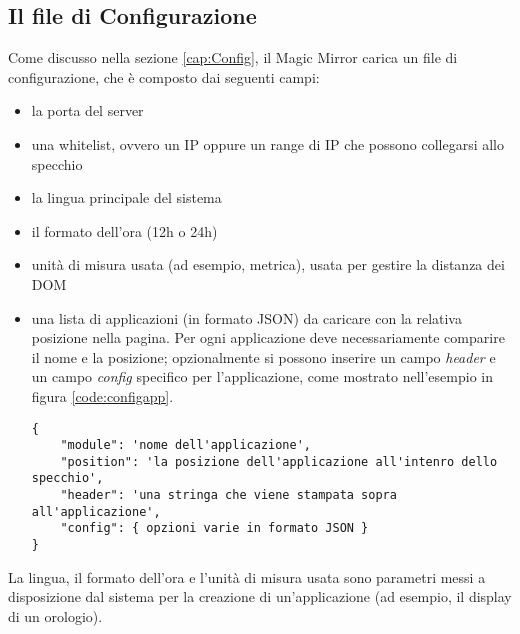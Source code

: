 \subsection{Il file di Configurazione}\label{cap:MMconf}
Come discusso nella sezione \ref{cap:Config}, il Magic Mirror carica un file di configurazione, che è composto dai seguenti campi:
\begin{itemize}
\item la porta del server
\item una whitelist, ovvero un IP oppure un range di IP che possono collegarsi allo specchio
\item la lingua principale del sistema
\item il formato dell'ora (12h o 24h)
\item unit\`a di misura usata (ad esempio, metrica), usata per gestire la distanza dei DOM
\item una lista di applicazioni (in formato JSON) da caricare con la relativa posizione nella pagina. Per ogni applicazione deve necessariamente comparire il
nome e la posizione; opzionalmente si possono inserire un campo  \textit{header} e un campo \textit{config} specifico per l'applicazione, come mostrato
nell'esempio in figura \ref{code:configapp}.
\begin{lstlisting}[label={code:configapp}]
{
	"module": 'nome dell'applicazione',
	"position": 'la posizione dell'applicazione all'intenro dello specchio',
	"header": 'una stringa che viene stampata sopra all'applicazione',
	"config": { opzioni varie in formato JSON }
}
\end{lstlisting}
\end{itemize}
La lingua, il formato dell'ora e l'unit\`a di misura usata sono parametri messi a disposizione dal sistema per la creazione di un'applicazione
(ad esempio, il display di un orologio).

